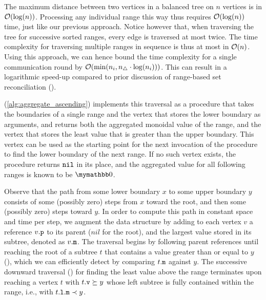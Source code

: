 \documentclass[conference]{IEEEtran}
\begin{document}
The maximum distance between two vertices in a balanced tree on $n$ vertices is in $\mathcal{O}(\log(n))$. Processing any individual range this way thus requires $\mathcal{O}(\log(n))$ time, just like our previous approach. Notice however that, when traversing the tree for successive sorted ranges, every edge is traversed at most twice. The time complexity for traversing multiple ranges in sequence is thus at most in $\mathcal{O}(n)$. Using this approach, we can hence bound the time complexity for a single communication round by $\mathcal{O}(\min(n_i, n_{\triangle} \cdot \log(n_i)))$. This can result in a logarithmic speed-up compared to prior discussion of range-based set reconciliation (\cite{chen1999prototype}\cite{shang2017survey}).

 (\cref{alg:aggregate_ascending}) implements this traversal as a procedure that takes the boundaries of a single range and the vertex that stores the lower boundary as arguments, and returns both the aggregated monoidal value of the range, and the vertex that stores the least value that is greater than the upper boundary. This vertex can be used as the starting point for the next invocation of the procedure to find the lower boundary of the next range. If no such vertex exists, the procedure returns $\mathtt{nil}$ in its place, and the aggregated value for all following ranges is known to be $\neutraladd$.

Observe that the path from some lower boundary $x$ to some upper boundary $y$ consists of some (possibly zero) steps from $x$ toward the root, and then some (possibly zero) steps toward $y$. In order to compute this path in constant space and time per step, we augment the data structure by adding to each vertex $v$ a reference ${v}\mathtt{.p}$ to its parent ($nil$ for the root), and the largest value stored in its subtree, denoted as ${v}\mathtt{.m}$. The traversal begins by following parent references until reaching the root of a subtree $t$ that contains a value greater than or equal to $y$ (), which we can efficiently detect by comparing ${t}\mathtt{.m}$ against $y$. The successive downward traversal () for finding the least value above the range terminates upon reaching a vertex $t$ with ${t}\mathtt{.v} \succeq y$ whose left subtree is fully contained within the range, i.e., with ${{t}\mathtt{.l}}\mathtt{.m} \prec y$.
\end{document}
